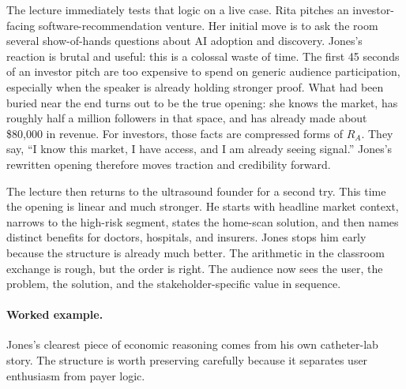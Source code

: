 The lecture immediately tests that logic on a live case. Rita pitches an investor-facing software-recommendation venture. Her initial move is to ask the room several show-of-hands questions about AI adoption and discovery. Jones's reaction is brutal and useful: this is a colossal waste of time. The first 45 seconds of an investor pitch are too expensive to spend on generic audience participation, especially when the speaker is already holding stronger proof. What had been buried near the end turns out to be the true opening: she knows the market, has roughly half a million followers in that space, and has already made about \$80{,}000 in revenue. For investors, those facts are compressed forms of \(R_A\). They say, ``I know this market, I have access, and I am already seeing signal.'' Jones's rewritten opening therefore moves traction and credibility forward.

The lecture then returns to the ultrasound founder for a second try. This time the opening is linear and much stronger. He starts with headline market context, narrows to the high-risk segment, states the home-scan solution, and then names distinct benefits for doctors, hospitals, and insurers. Jones stops him early because the structure is already much better. The arithmetic in the classroom exchange is rough, but the order is right. The audience now sees the user, the problem, the solution, and the stakeholder-specific value in sequence.

\paragraph{Worked example.} Jones's clearest piece of economic reasoning comes from his own catheter-lab story. The structure is worth preserving carefully because it separates user enthusiasm from payer logic.

